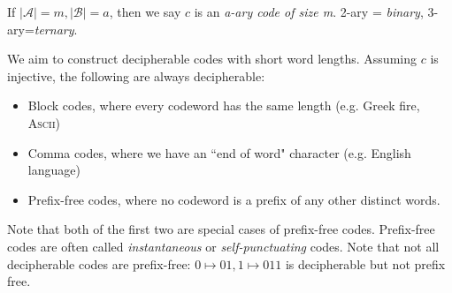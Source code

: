 \documentclass[10pt,a4paper]{article}
\begin{document}
If $|\mathscr{A}|=m, |\mathscr{B}|=a$, then we say $c$ is an \emph{a-ary code of size m}. 2-ary = \emph{binary}, 3-ary=\emph{ternary}.

We aim to construct decipherable codes with short word lengths. Assuming $c$ is injective, the following are always decipherable:
\begin{itemize}
\item Block codes, where every codeword has the same length (e.g. Greek fire, \textsc{Ascii})
\item Comma codes, where we have an ``end of word" character (e.g. English language)
\item Prefix-free codes, where no codeword is a prefix of any other distinct words.
\end{itemize}
Note that both of the first two are special cases of prefix-free codes. Prefix-free codes are often called \emph{instantaneous} or \emph{self-punctuating} codes. Note that not all decipherable codes are prefix-free: $0\mapsto 01, 1 \mapsto 011$ is decipherable but not prefix free.
\end{document}
